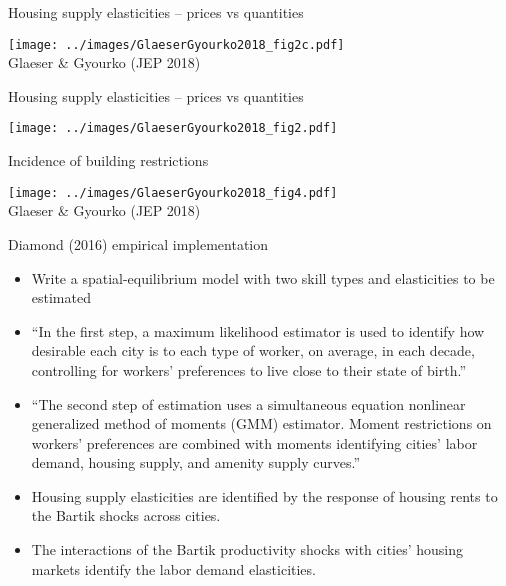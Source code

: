 \documentclass[10pt,notes=hide]{beamer}
\begin{document}
\begin{frame}{Housing supply elasticities -- prices vs quantities}
\begin{center}
\texttt{[image: ../images/GlaeserGyourko2018\_fig2c.pdf]}\\
Glaeser \& Gyourko (JEP 2018)\end{center}
\end{frame}
\begin{frame}{Housing supply elasticities -- prices vs quantities}
\begin{center}
\texttt{[image: ../images/GlaeserGyourko2018\_fig2.pdf]}
\end{center}
\end{frame}
\begin{frame}{Incidence of building restrictions}
\begin{center}
\texttt{[image: ../images/GlaeserGyourko2018\_fig4.pdf]}\\
Glaeser \& Gyourko (JEP 2018)\end{center}
\end{frame}
\begin{frame}{Diamond (2016) empirical implementation}
\begin{itemize}
	\item Write a spatial-equilibrium model with two skill types and elasticities to be estimated
	\item ``In the first step, a maximum likelihood estimator is used to identify how desirable each city is to each type of worker, on average, in each decade, controlling for workers' preferences to live close to their state of birth.''
	\item ``The second step of estimation uses a simultaneous equation nonlinear generalized method of moments (GMM) estimator. Moment restrictions on workers' preferences are combined with moments identifying cities' labor demand, housing supply, and amenity supply curves.''
	\item Housing supply elasticities are identified by the response of housing rents to the Bartik shocks across cities. 
	\item The interactions of the Bartik productivity shocks with cities' housing markets identify the labor demand elasticities.
\end{itemize}
\end{frame}
\end{document}
